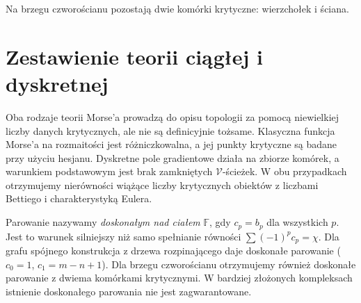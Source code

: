 \begin{samepage}
\begin{center}
\begin{minipage}{.96\linewidth}\centering
{}\par\smallskip

{\footnotesize Na brzegu czworościanu pozostają dwie komórki
krytyczne: wierzchołek i ściana.}
\end{minipage}
\end{center}
\end{samepage}

\section{Zestawienie teorii ciągłej i dyskretnej}
\label{sec:tg-morse-bridge}

Oba rodzaje teorii Morse'a prowadzą do opisu topologii
za pomocą niewielkiej liczby danych krytycznych,
ale nie są definicyjnie tożsame. Klasyczna funkcja
Morse'a na rozmaitości jest różniczkowalna, a jej
punkty krytyczne są badane przy użyciu hesjanu.
Dyskretne pole gradientowe działa na zbiorze komórek,
a warunkiem podstawowym jest brak zamkniętych
$\mathcal V$-ścieżek. W obu przypadkach otrzymujemy
nierówności wiążące liczby krytycznych obiektów
z liczbami Bettiego i charakterystyką Eulera.

\begin{uwaga}
Parowanie nazywamy \emph{doskonałym nad ciałem}
$\mathbb F$, gdy $c_p=b_p$ dla wszystkich $p$.
Jest to warunek silniejszy niż samo spełnianie równości
$\sum(-1)^pc_p=\chi$. Dla grafu spójnego konstrukcja
z drzewa rozpinającego daje doskonałe parowanie
($c_0=1$, $c_1=m-n+1$). Dla brzegu czworościanu
otrzymujemy również doskonałe parowanie z dwiema
komórkami krytycznymi. W bardziej złożonych
kompleksach istnienie doskonałego parowania nie jest
zagwarantowane.
\end{uwaga}

